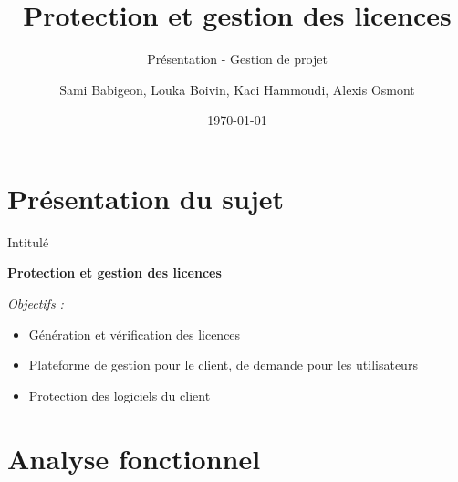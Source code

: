\documentclass{cubeamer}
\title{Protection et gestion des licences}
\subtitle{Présentation - Gestion de projet}
\author{Sami Babigeon, Louka Boivin, Kaci Hammoudi, Alexis Osmont}
\date{\today}
\institute[Université de Rouen]{Master Informatique - 1ère année}
\begin{document}
\maketitle

\cutoc

%
%

\section{Présentation du sujet}

\begin{frame}{Intitulé}
    \centerline{\textbf{Protection et gestion des licences}}
    \medskip
    \pause
    \emph{Objectifs :}
    \pause
    \begin{itemize}
        \item Génération et vérification des licences
        \pause
        \item Plateforme de gestion pour le client, de demande pour les utilisateurs
        \pause
        \item Protection des logiciels du client
    \end{itemize}
\end{frame}

\section{Analyse fonctionnel}
\end{document}
